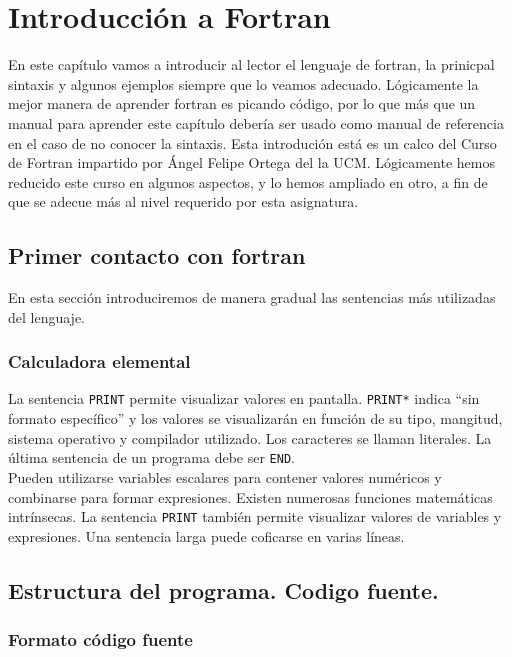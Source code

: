 \chapter{Introducción a Fortran}

En este capítulo vamos a introducir al lector el lenguaje de fortran, la prinicpal sintaxis y algunos ejemplos siempre que lo veamos adecuado. Lógicamente la mejor manera de aprender fortran es picando código, por lo que más que un manual para aprender este capítulo debería ser usado como manual de referencia en el caso de no conocer la sintaxis. Esta introdución está es un calco del Curso de Fortran impartido por Ángel Felipe Ortega del la UCM. Lógicamente hemos reducido este curso en algunos aspectos, y lo hemos ampliado en otro, a fin de que se adecue más al nivel requerido por esta asignatura.



\section{Primer contacto con fortran}

En esta sección introduciremos de manera gradual las sentencias más utilizadas del lenguaje.

\subsection{Calculadora elemental}

La sentencia {\tt PRINT} permite visualizar valores en pantalla.  {\tt PRINT*} indica ``sin formato específico'' y los valores se visualizarán en función de su tipo, mangitud, sistema operativo y compilador utilizado. Los caracteres se llaman literales. La última sentencia de un programa debe ser {\tt END}. \\

Pueden utilizarse variables escalares para contener valores numéricos y combinarse para formar expresiones. Existen numerosas funciones matemáticas intrínsecas. La sentencia {\tt PRINT} también permite visualizar valores de variables y expresiones. Una sentencia larga puede coficarse en varias líneas. 


\section{Estructura del programa. Codigo fuente.}

\subsection{Formato código fuente}

